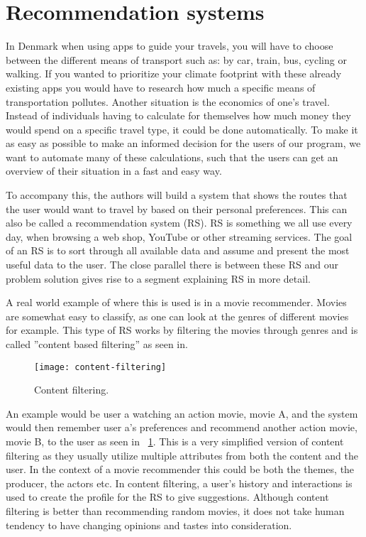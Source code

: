 \section{Recommendation systems}\label{sec:recommendation-systems}

In Denmark when using apps to guide your travels, you will have to choose between the different means of transport such
as: by car, train, bus, cycling or walking.
If you wanted to prioritize your climate footprint with these already existing apps you would have to research how much
a specific means of transportation pollutes.
Another situation is the economics of one's travel.
Instead of individuals having to calculate for themselves how much money they would spend on a specific travel type,
it could be done automatically.
To make it as easy as possible to make an informed decision for the users of our program, we want to automate many of
these calculations, such that the users can get an overview of their situation in a fast and easy way.

To accompany this, the authors will build a system that shows the routes that the user would want to travel by based on
their personal preferences.
This can also be called a recommendation system (RS).
RS is something we all use every day, when browsing a web shop, YouTube or other streaming services.
The goal of an RS is to sort through all available data and assume and present the most useful data to the user.
The close parallel there is between these RS and our problem solution gives rise to a segment explaining RS in more
detail.

A real world example of where this is used is in a movie recommender.
Movies are somewhat easy to classify, as one can look at the genres of different movies for example.
This type of RS works by filtering the movies through genres and is called ''content based filtering'' as seen in.

\begin{figure}
    \centering
    \texttt{[image: content-filtering]}
    \caption{Content filtering.}
    \label{fig:figure3}
\end{figure}

An example would be user a watching an action movie, movie A, and the system would then remember user a's preferences
and recommend another action movie, movie B, to the user as seen in ~\ref{fig:figure3}.
This is a very simplified version of content filtering as they usually utilize multiple attributes from both the content
and the user.
In the context of a movie recommender this could be both the themes, the producer, the actors etc.
In content filtering, a user's history and interactions is used to create the profile for the RS to give suggestions.
Although content filtering is better than recommending random movies, it does not take human tendency to have changing
opinions and tastes into consideration.


